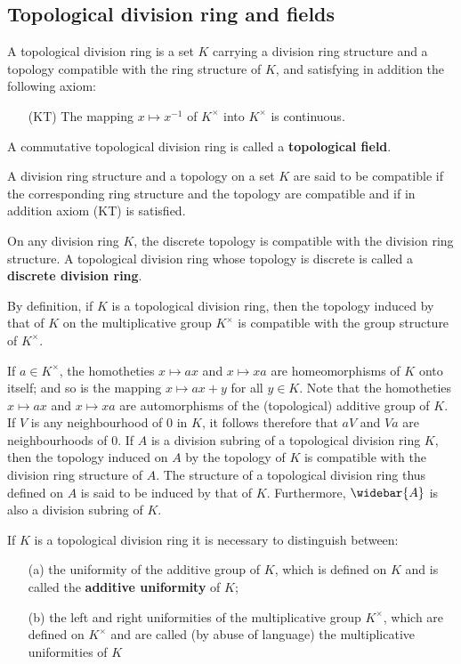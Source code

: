 \subsection{Topological division ring and fields}
\begin{definition}
A topological division ring is a set $K$ carrying a division ring structure and a topology compatible with the ring structure of $K$, and satisfying in addition the following axiom:
\begin{enumerate}
\item[(KT)] The mapping $x\mapsto x^{-1}$ of $K^\times$ into $K^\times$ is continuous.
\end{enumerate}
A commutative topological division ring is called a \textbf{topological field}.
\end{definition}
A division ring structure and a topology on a set $K$ are said to be compatible if the corresponding ring structure and the topology are compatible and if in addition axiom (KT) is satisfied.
\begin{example}
On any division ring $K$, the discrete topology is compatible with the division ring structure. A topological division ring whose topology is discrete is called a \textbf{discrete division ring}.
\end{example}
By definition, if $K$ is a topological division ring, then the topology induced by that of $K$ on the multiplicative group $K^\times$ is compatible with the group structure of $K^\times$.\par
If $a\in K^\times$, the homotheties $x\mapsto ax$ and $x\mapsto xa$ are homeomorphisms of $K$ onto itself; and so is the mapping $x\mapsto ax+y$ for all $y\in K$. Note that the homotheties $x\mapsto ax$ and $x\mapsto xa$ are automorphisms of the (topological) additive group of $K$. If $V$ is any neighbourhood of $0$ in $K$, it follows therefore that $aV$ and $Va$ are neighbourhoods of $0$.
If $A$ is a division subring of a topological division ring $K$, then the topology induced on $A$ by the topology of $K$ is compatible with the division ring structure of $A$. The structure of a topological division ring thus defined on $A$ is said to be induced by that of $K$. Furthermore, $\widebar{A}$ is also a division subring of $K$.\par
If $K$ is a topological division ring it is necessary to distinguish between:
\begin{itemize}
\item[(a)] the uniformity of the additive group of $K$, which is defined on $K$ and is called the \textbf{additive uniformity} of $K$;
\item[(b)] the left and right uniformities of the multiplicative group $K^\times$, which are defined on $K^\times$ and are called (by abuse of language) the multiplicative uniformities of $K$
\end{itemize}
